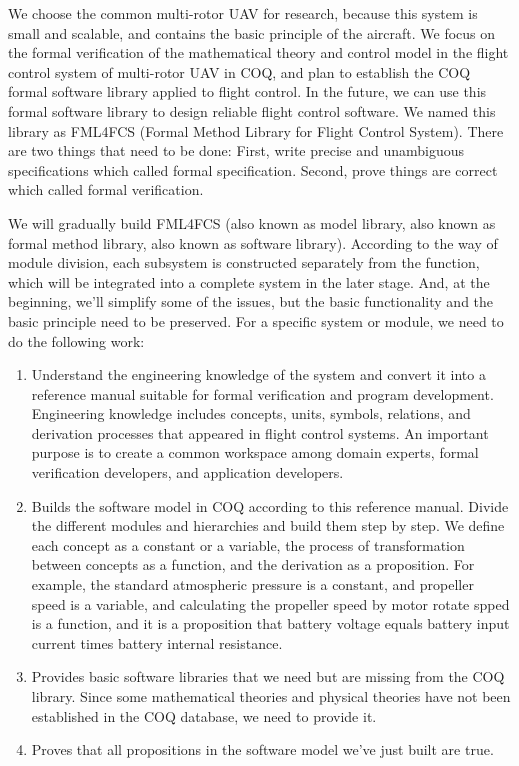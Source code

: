 \documentclass{article} %
\numberwithin{equation}{section} %
\begin{document}
We choose the common multi-rotor UAV for research, because this system is small and scalable, and contains the basic principle of the aircraft.
We focus on the formal verification of the mathematical theory and control model in the flight control system of multi-rotor UAV in COQ, and plan to establish the COQ formal software library applied to flight control.
In the future, we can use this formal software library to design reliable flight control software.
We named this library as FML4FCS (Formal Method Library for Flight Control System).
There are two things that need to be done: 
First, write precise and unambiguous specifications which called formal specification.
Second, prove things are correct which called formal verification.

We will gradually build FML4FCS (also known as model library, also known as formal method library, also known as software library).
According to the way of module division, each subsystem is constructed separately from the function, which will be integrated into a complete system in the later stage.
And, at the beginning, we'll simplify some of the issues, but the basic functionality and the basic principle  need to be preserved.
For a specific system or module, we need to do the following work:
\begin{enumerate}
\item Understand the engineering knowledge of the system and convert it into a reference manual suitable for formal verification and program development.
Engineering knowledge includes concepts, units, symbols, relations, and derivation processes that appeared in flight control systems.
An important purpose is to create a common workspace among domain experts, formal verification developers, and application developers.
\item Builds the software model in COQ according to this reference manual.
Divide the different modules and hierarchies and build them step by step.
We define each concept as a constant or a variable, the process of transformation between concepts as a function, and the derivation as a proposition.
For example, the standard atmospheric pressure is a constant, and propeller speed is a variable, 
and calculating the propeller speed by motor rotate spped is a function, and it is a proposition that battery voltage equals battery input current times battery internal resistance.
\item Provides basic software libraries that we need but are missing from the COQ library.
Since some mathematical theories and physical theories have not been established in the COQ database, we need to provide it.
\item Proves that all propositions in the software model we've just built are true.
\end{enumerate}
\end{document}
